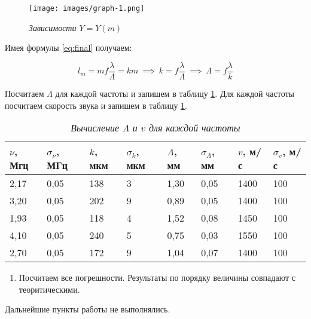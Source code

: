 \documentclass[a4paper,12pt]{article}
\begin{document}
\FloatBarrier
\begin{figure}[!ht]
        \centering
	\texttt{[image: images/graph-1.png]}
	\caption{\textit{Зависимости $Y = Y(m)$}}
	\label{graph:1}
\end{figure}
\FloatBarrier

\clearpage

Имея формулы \eqref{eq:final} получаем:

\begin{equation*}
    l_m = m f \frac{\lambda}{\Lambda} = k m \ \implies \ k = f \frac{\lambda}{\Lambda} \ \implies \ \Lambda = f \frac{\lambda}{k}
\end{equation*}

Посчитаем $\Lambda$ для каждой частоты и запишем в таблицу \ref{table:2}. Для каждой частоты посчитаем скорость звука и запишем в таблицу \ref{table:2}.

\begin{table}[!ht]
    \centering
    \caption{\textit{Вычисление $\Lambda$ и $v$ для каждой частоты}}
    \begin{tabular}{|l|l|l|l|l|l|l|l|}
        \hline
        $\nu$, Мгц & $\sigma_\nu$, МГц & $k$, мкм & $\sigma_k$, мкм & $\Lambda$, мм & $\sigma_\Lambda$, мм & $v$, м/с & $\sigma_v$, м/с \\ \hline
        2,17 & 0,05 & 138 & 3 & 1,30 & 0,05 & 1400   & 100  \\ \hline
        3,20 & 0,05 & 202 & 9 & 0,89 & 0,05 & 1400   & 100  \\ \hline
        1,93 & 0,05 & 118 & 4 & 1,52 & 0,08 & 1450   & 100  \\ \hline
        4,10 & 0,05 & 240 & 5 & 0,75 & 0,03 & 1550   & 100  \\ \hline
        2,70 & 0,05 & 172 & 9 & 1,04 & 0,07 & 1400   & 100  \\ \hline
    \end{tabular}
    \label{table:2}
\end{table}

\begin{enumerate}[resume]
    \item Посчитаем все погрешности. Результаты по порядку величины совпадают с теоритическими.
\end{enumerate}

Дальнейшие пункты работы не выполнялись.
\end{document}
